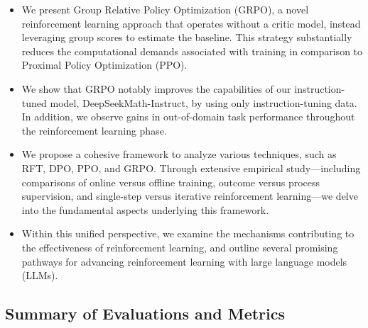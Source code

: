\begin{itemize}[topsep=0pt]
    \item We present Group Relative Policy Optimization (GRPO), a novel reinforcement learning approach that operates without a critic model, instead leveraging group scores to estimate the baseline. This strategy substantially reduces the computational demands associated with training in comparison to Proximal Policy Optimization (PPO).
    \item We show that GRPO notably improves the capabilities of our instruction-tuned model, DeepSeekMath-Instruct, by using only instruction-tuning data. In addition, we observe gains in out-of-domain task performance throughout the reinforcement learning phase.
    \item We propose a cohesive framework to analyze various techniques, such as RFT, DPO, PPO, and GRPO. Through extensive empirical study—including comparisons of online versus offline training, outcome versus process supervision, and single-step versus iterative reinforcement learning—we delve into the fundamental aspects underlying this framework.
    \item Within this unified perspective, we examine the mechanisms contributing to the effectiveness of reinforcement learning, and outline several promising pathways for advancing reinforcement learning with large language models (LLMs).
\end{itemize}

\subsection{Summary of Evaluations and Metrics}

